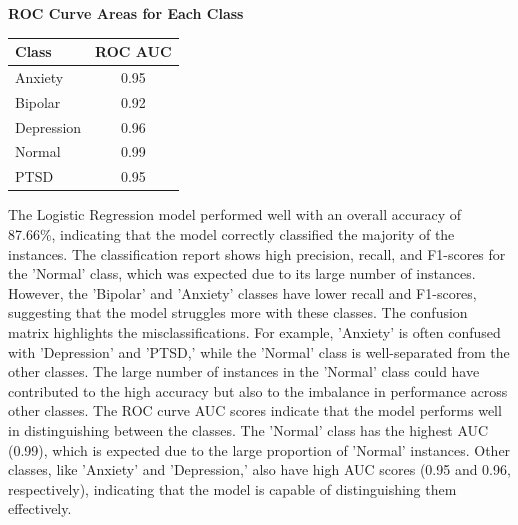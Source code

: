 \vspace{0.25em}

\begin{center}
    \textbf{ROC Curve Areas for Each Class} \\[0.5em]
    \begin{tabular}{|l|c|}
        \hline
        \textbf{Class}  & \textbf{ROC AUC} \\ \hline
        Anxiety         & 0.95            \\ \hline
        Bipolar         & 0.92            \\ \hline
        Depression      & 0.96            \\ \hline
        Normal          & 0.99            \\ \hline
        PTSD            & 0.95            \\ \hline
    \end{tabular}
\end{center}

\vspace{0.25em}

\noindent
The Logistic Regression model performed well with an overall accuracy of 87.66\%, indicating that the model correctly classified the majority of the instances. The classification report shows high precision, recall, and F1-scores for the 'Normal' class, which was expected due to its large number of instances. However, the 'Bipolar' and 'Anxiety' classes have lower recall and F1-scores, suggesting that the model struggles more with these classes. The confusion matrix highlights the misclassifications. For example, 'Anxiety' is often confused with 'Depression' and 'PTSD,' while the 'Normal' class is well-separated from the other classes. The large number of instances in the 'Normal' class could have contributed to the high accuracy but also to the imbalance in performance across other classes. The ROC curve AUC scores indicate that the model performs well in distinguishing between the classes. The 'Normal' class has the highest AUC (0.99), which is expected due to the large proportion of 'Normal' instances. Other classes, like 'Anxiety' and 'Depression,' also have high AUC scores (0.95 and 0.96, respectively), indicating that the model is capable of distinguishing them effectively.



